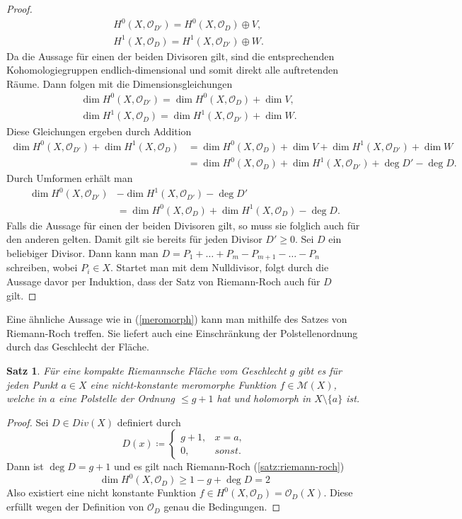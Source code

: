 \documentclass[11pt,a4paper,toc=bibliography]{scrartcl}
\theoremstyle{def}
\theoremstyle{thm}
\newtheorem{satz}[defi]{Satz}
\theoremstyle{remark}
\begin{document}
\begin{proof}
\begin{align*}
	&H^0(X,\mathcal{O}_{D'})=H^0(X,\mathcal{O}_D)\oplus V,\\
	&H^1(X,\mathcal{O}_D)=H^1(X,\mathcal{O}_{D'})\oplus W.
\end{align*}
Da die Aussage für einen der beiden Divisoren gilt, sind die entsprechenden Kohomologiegruppen endlich-dimensional und somit direkt alle auftretenden Räume. Dann folgen mit \cite[~S.204]{algebraic} die Dimensionsgleichungen
\begin{align*}
&\dim H^0(X,\mathcal{O}_{D'})=\dim H^0(X,\mathcal{O}_D)+\dim V,\\
&\dim H^1(X,\mathcal{O}_D)=\dim H^1(X,\mathcal{O}_{D'})+\dim W.
\end{align*}
Diese Gleichungen ergeben durch Addition
\begin{align*}
	\dim H^0(X,\mathcal{O}_{D'})+\dim H^1(X,\mathcal{O}_D) &=\dim H^0(X,\mathcal{O}_D)+\dim V+\dim H^1(X,\mathcal{O}_{D'})+\dim W\\
	&=\dim H^0(X,\mathcal{O}_D)+\dim H^1(X,\mathcal{O}_{D'})+\deg D'-\deg D.
\end{align*}
Durch Umformen erhält man
\begin{align*}
\dim H^0(X,\mathcal{O}_{D'})&-\dim H^1(X,\mathcal{O}_{D'})-\deg D'\\
							&=\dim H^0(X,\mathcal{O}_D)+\dim H^1(X,\mathcal{O}_D)-\deg D.	
\end{align*}
Falls die Aussage für einen der beiden Divisoren gilt, so muss sie folglich auch für den anderen gelten. Damit gilt sie bereits für jeden Divisor $D'\geq 0$. Sei $D$ ein beliebiger Divisor. Dann kann man $D=P_1+\ldots+P_m-P_{m+1}-\ldots-P_n$ schreiben, wobei $P_i\in X.$ Startet man mit dem Nulldivisor, folgt durch die Aussage davor per Induktion, dass der Satz von Riemann-Roch auch für $D$ gilt.
\end{proof}
Eine ähnliche Aussage wie in (\ref{meromorph}) kann man mithilfe des Satzes von Riemann-Roch treffen. Sie liefert auch eine Einschränkung der Polstellenordnung durch das Geschlecht der Fläche.
\begin{satz}
	Für eine kompakte Riemannsche Fläche vom Geschlecht $g$ gibt es für jeden Punkt $a\in X$ eine nicht-konstante meromorphe Funktion $f\in \mathcal{M}(X)$, welche in $a$ eine Polstelle der Ordnung $\leq g+1$ hat und holomorph in $X\setminus\{a\}$ ist.
\end{satz} 
\begin{proof}
	Sei $D\in Div(X)$ definiert durch
	\[
		D(x)\coloneqq
	\begin{cases}
		g+1, &x=a,\\
		0, &sonst.
	\end{cases}
	\]
	Dann ist $\deg D = g+1$ und es gilt nach Riemann-Roch (\ref{satz:riemann-roch})
	\[
	\dim H^0(X,\mathcal{O}_D)\geq 1-g+\deg D=2 
	\]
	Also existiert eine nicht konstante Funktion $f\in H^0(X,\mathcal{O}_D)=\mathcal{O}_D(X)$. Diese erfüllt wegen der Definition von $\mathcal{O}_D$ genau die Bedingungen.
\end{proof}
\end{document}

